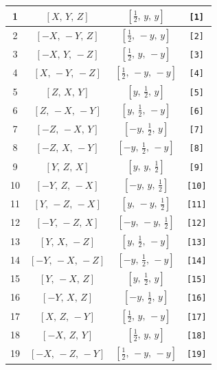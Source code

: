 \documentclass[fleqn,8pt]{jsarticle}
\begin{document}
\begin{longtable}{cccc}
1 & $\left[ X,\, Y,\, Z \right]$ & $\left[ \frac{1}{2},\, y,\, y \right]$ & {\tt [1]} \\ \hline
2 & $\left[ - X,\, - Y,\, Z \right]$ & $\left[ \frac{1}{2},\, - y,\, y \right]$ & {\tt [2]} \\ \hline
3 & $\left[ - X,\, Y,\, - Z \right]$ & $\left[ \frac{1}{2},\, y,\, - y \right]$ & {\tt [3]} \\ \hline
4 & $\left[ X,\, - Y,\, - Z \right]$ & $\left[ \frac{1}{2},\, - y,\, - y \right]$ & {\tt [4]} \\ \hline
5 & $\left[ Z,\, X,\, Y \right]$ & $\left[ y,\, \frac{1}{2},\, y \right]$ & {\tt [5]} \\ \hline
6 & $\left[ Z,\, - X,\, - Y \right]$ & $\left[ y,\, \frac{1}{2},\, - y \right]$ & {\tt [6]} \\ \hline
7 & $\left[ - Z,\, - X,\, Y \right]$ & $\left[ - y,\, \frac{1}{2},\, y \right]$ & {\tt [7]} \\ \hline
8 & $\left[ - Z,\, X,\, - Y \right]$ & $\left[ - y,\, \frac{1}{2},\, - y \right]$ & {\tt [8]} \\ \hline
9 & $\left[ Y,\, Z,\, X \right]$ & $\left[ y,\, y,\, \frac{1}{2} \right]$ & {\tt [9]} \\ \hline
10 & $\left[ - Y,\, Z,\, - X \right]$ & $\left[ - y,\, y,\, \frac{1}{2} \right]$ & {\tt [10]} \\ \hline
11 & $\left[ Y,\, - Z,\, - X \right]$ & $\left[ y,\, - y,\, \frac{1}{2} \right]$ & {\tt [11]} \\ \hline
12 & $\left[ - Y,\, - Z,\, X \right]$ & $\left[ - y,\, - y,\, \frac{1}{2} \right]$ & {\tt [12]} \\ \hline
13 & $\left[ Y,\, X,\, - Z \right]$ & $\left[ y,\, \frac{1}{2},\, - y \right]$ & {\tt [13]} \\ \hline
14 & $\left[ - Y,\, - X,\, - Z \right]$ & $\left[ - y,\, \frac{1}{2},\, - y \right]$ & {\tt [14]} \\ \hline
15 & $\left[ Y,\, - X,\, Z \right]$ & $\left[ y,\, \frac{1}{2},\, y \right]$ & {\tt [15]} \\ \hline
16 & $\left[ - Y,\, X,\, Z \right]$ & $\left[ - y,\, \frac{1}{2},\, y \right]$ & {\tt [16]} \\ \hline
17 & $\left[ X,\, Z,\, - Y \right]$ & $\left[ \frac{1}{2},\, y,\, - y \right]$ & {\tt [17]} \\ \hline
18 & $\left[ - X,\, Z,\, Y \right]$ & $\left[ \frac{1}{2},\, y,\, y \right]$ & {\tt [18]} \\ \hline
19 & $\left[ - X,\, - Z,\, - Y \right]$ & $\left[ \frac{1}{2},\, - y,\, - y \right]$ & {\tt [19]} \\ \hline

\end{longtable}
\end{document}
